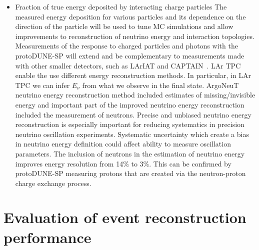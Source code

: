 \begin{itemize}
\item Fraction of true energy deposited by interacting charge particles 
The measured energy deposition for various particles and its dependence on the direction of the particle will be used to tune
MC simulations and allow improvements to reconstruction of neutrino energy and interaction topologies. %
Measurements of the response to charged particles and
photons with the protoDUNE-SP will extend and be complementary to
measurements made with other smaller detectors, such as LArIAT \cite{lariat}
and CAPTAIN~\cite{captain}.
 LAr TPC enable the use different energy reconstruction methods. In particular, in LAr TPC we can infer $E_\nu$ from what we observe in the final state. ArgoNeuT neutrino energy reconstruction method included estimates of missing/invisible energy and important part of  the improved neutrino energy reconstruction included the measurement of neutrons. Precise and unbiased neutrino energy reconstruction is especially important for reducing systematics in precision neutrino oscillation experiments. Systematic uncertainty which create a bias in neutrino energy definition could affect ability to measure oscillation parameters.  The inclusion of neutrons in the estimation of neutrino energy improves energy resolution from 14\% to 3\%.  This can be confirmed by protoDUNE-SP measuring protons that are created via the neutron-proton charge exchange process.
\end{itemize}

\section{Evaluation of event reconstruction performance}


